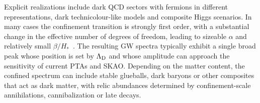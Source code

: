 \documentclass[a4paper,11pt]{article}
\begin{document}
Explicit realizations include dark QCD sectors with fermions in different representations, dark technicolour-like models 
and composite Higgs scenarios. In many cases the confinement transition is strongly first order, with a substantial change 
in the effective number of degrees of freedom, leading to sizeable $\alpha$ and relatively small
$\beta/H_*$~\citep{Schwaller:2015tja,Pasechnik:2024Composite}. The resulting GW spectra typically exhibit a single broad 
peak whose position is set by $\Lambda_{\rm D}$ and whose amplitude can approach the sensitivity of current PTAs and SKAO.
Depending on the matter content, the confined spectrum can include stable glueballs, dark baryons or other composites that 
act as dark matter, with relic abundances determined by confinement-scale annihilations, cannibalization or late
decays.
\end{document}

